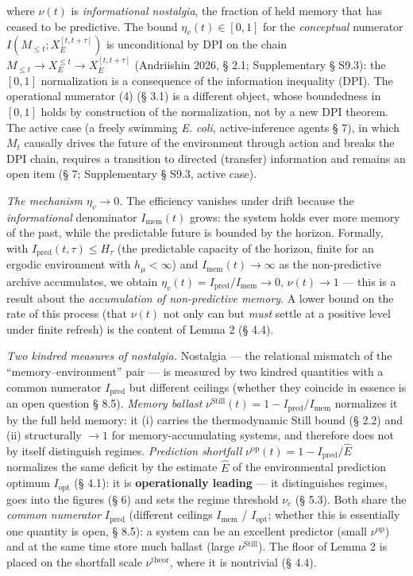 \documentclass[pdflatex,sn-mathphys-ay]{sn-jnl}
\begin{document}
where \(\nu(t)\) is \emph{informational nostalgia}, the fraction of held memory that has ceased to be predictive. The bound \(\eta_v(t) \in [0,1]\) for the \emph{conceptual} numerator \(I(M_{\le t}; X_E^{[t,t+\tau]})\) is unconditional by DPI on the chain \(M_{\le t} \to X_E^{\le t} \to X_E^{[t,t+\tau]}\) (Andriishin 2026, § 2.1; Supplementary § S9.3): the \([0,1]\) normalization is a consequence of the information inequality (DPI). The operational numerator (4) (§ 3.1) is a different object, whose boundedness in \([0,1]\) holds by construction of the normalization, not by a new DPI theorem. The active case (a freely swimming \emph{E. coli}, active-inference agents § 7), in which \(M_t\) causally drives the future of the environment through action and breaks the DPI chain, requires a transition to directed (transfer) information and remains an open item (§ 7; Supplementary § S9.3, active case).



\emph{The mechanism \(\eta_v \to 0\).} The efficiency vanishes under drift because the \emph{informational} denominator \(I_{\text{mem}}(t)\) grows: the system holds ever more memory of the past, while the predictable future is bounded by the horizon. Formally, with \(I_{\text{pred}}(t,\tau) \le H_\tau\) (the predictable capacity of the horizon, finite for an ergodic environment with \(h_\mu < \infty\)) and \(I_{\text{mem}}(t) \to \infty\) as the non-predictive archive accumulates, we obtain \(\eta_v(t) = I_{\text{pred}}/I_{\text{mem}} \to 0\), \(\nu(t) \to 1\) --- this is a result about the \emph{accumulation of non-predictive memory}. A lower bound on the rate of this process (that \(\nu(t)\) not only can but \emph{must} settle at a positive level under finite refresh) is the content of Lemma 2 (§ 4.4).



\emph{Two kindred measures of nostalgia.} Nostalgia --- the relational mismatch of the ``memory--environment'' pair --- is measured by two kindred quantities with a common numerator \(I_{\text{pred}}\) but different ceilings (whether they coincide in essence is an open question § 8.5). \emph{Memory ballast} \(\nu^{\text{Still}}(t) = 1 - I_{\text{pred}}/I_{\text{mem}}\) normalizes it by the full held memory: it (i) carries the thermodynamic Still bound (§ 2.2) and (ii) structurally \(\to 1\) for memory-accumulating systems, and therefore does not by itself distinguish regimes. \emph{Prediction shortfall} \(\nu^{\text{op}}(t) = 1 - I_{\text{pred}}/\hat E\) normalizes the same deficit by the estimate \(\hat E\) of the environmental prediction optimum \(I_{\text{opt}}\) (§ 4.1): it is \textbf{operationally leading} --- it distinguishes regimes, goes into the figures (§ 6) and sets the regime threshold \(\nu_c\) (§ 5.3). Both share the \emph{common numerator} \(I_{\text{pred}}\) (different ceilings \(I_{\text{mem}}\) / \(I_{\text{opt}}\); whether this is essentially one quantity is open, § 8.5): a system can be an excellent predictor (small \(\nu^{\text{op}}\)) and at the same time store much ballast (large \(\nu^{\text{Still}}\)). The floor of Lemma 2 is placed on the shortfall scale \(\nu^{\text{theor}}\), where it is nontrivial (§ 4.4).
\end{document}
